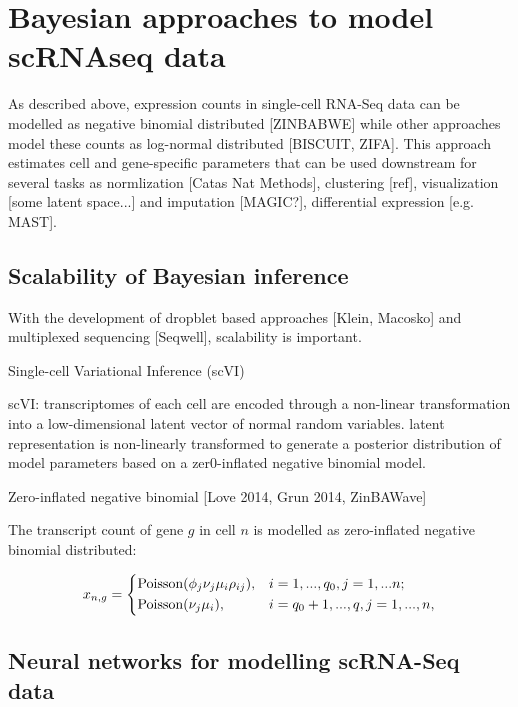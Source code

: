 
\section{Bayesian approaches to model scRNAseq data}

As described above, expression counts in single-cell RNA-Seq data can be modelled as negative binomial distributed [ZINBABWE] while other approaches model these counts as log-normal distributed [BISCUIT, ZIFA]. This approach estimates cell and gene-specific parameters that can be used downstream for several tasks as normlization [Catas Nat Methods], clustering [ref], visualization [some latent space...] and imputation [MAGIC?], differential expression [e.g. MAST].   


\subsection{Scalability of Bayesian inference}

With the development of dropblet based approaches [Klein, Macosko] and multiplexed sequencing [Seqwell], scalability is important. 

Single-cell Variational Inference (scVI) 

scVI: transcriptomes of each cell are encoded through a non-linear transformation into a low-dimensional latent vector of normal random variables. latent representation is non-linearly transformed to generate a posterior distribution of model parameters based on a zer0-inflated negative binomial model. 

Zero-inflated negative binomial [Love 2014, Grun 2014, ZinBAWave]

The transcript count of gene $g$ in cell $n$ is modelled as zero-inflated negative binomial distributed:

\begin{align*}
x_{n,g} = 
 \left\lbrace
  \begin{aligned}
    &\textnormal{Poisson}(\phi_j\nu_j\mu_i\rho_{ij}), && i=1,...,q_0,j=1,...n;  \\ 
    &\textnormal{Poisson}(\nu_j\mu_i), && i=q_0+1,...,q,j=1,...,n,    	    
  \end{aligned}
\right.
\end{align*}

\subsection{Neural networks for modelling scRNA-Seq data}
 

